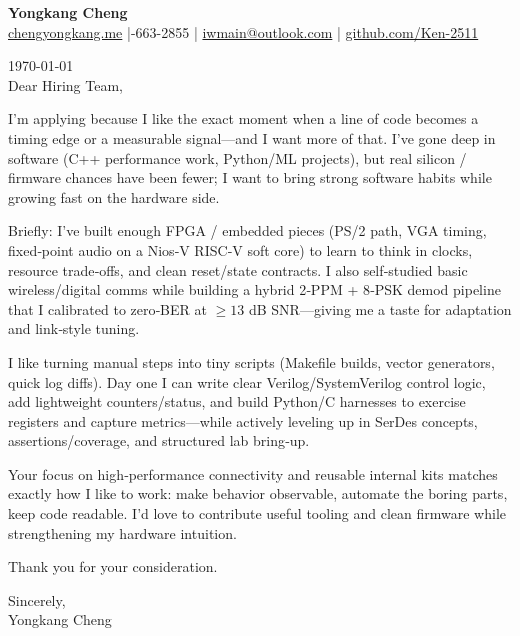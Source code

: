 \documentclass[11pt]{article}
\begin{document}
{\Large \textbf{Yongkang Cheng}}\\[2pt]
\href{https://chengyongkang.me/}{chengyongkang.me} \;|-663-2855 \;|\; \href{mailto:iwmain@outlook.com}{iwmain@outlook.com} \;|\; \href{https://github.com/Ken-2511}{github.com/Ken-2511}

\today\\[0.8em]

Dear Hiring Team,

I’m applying because I like the exact moment when a line of code becomes a timing edge or a measurable signal—and I want more of that. I’ve gone deep in software (C++ performance work, Python/ML projects), but real silicon / firmware chances have been fewer; I want to bring strong software habits while growing fast on the hardware side.

Briefly: I’ve built enough FPGA / embedded pieces (PS/2 path, VGA timing, fixed‑point audio on a Nios‑V RISC‑V soft core) to learn to think in clocks, resource trade‑offs, and clean reset/state contracts. I also self‑studied basic wireless/digital comms while building a hybrid 2‑PPM + 8‑PSK demod pipeline that I calibrated to zero‑BER at $\geq 13$ dB SNR—giving me a taste for adaptation and link‑style tuning.

I like turning manual steps into tiny scripts (Makefile builds, vector generators, quick log diffs). Day one I can write clear Verilog/SystemVerilog control logic, add lightweight counters/status, and build Python/C harnesses to exercise registers and capture metrics—while actively leveling up in SerDes concepts, assertions/coverage, and structured lab bring‑up.

Your focus on high‑performance connectivity and reusable internal kits matches exactly how I like to work: make behavior observable, automate the boring parts, keep code readable. I’d love to contribute useful tooling and clean firmware while strengthening my hardware intuition.

Thank you for your consideration.

\vspace{1em}
Sincerely,\\[1.2em]
Yongkang Cheng
\end{document}
